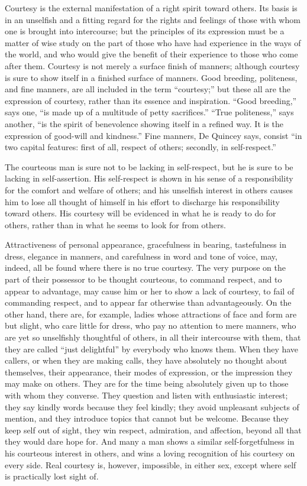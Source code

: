 \documentclass[
]{book}
\begin{document}
Courtesy is the external manifestation of a right spirit toward others. Its basis is in an unselfish and a fitting regard for the rights and feelings of those with whom one is brought into intercourse; but the principles of its expression must be a matter of wise study on the part of those who have had experience in the ways of the world, and who would give the benefit of their experience to those who come after them. Courtesy is not merely a surface finish of manners; although courtesy is sure to show itself in a finished surface of manners. Good breeding, politeness, and fine manners, are all included in the term ``courtesy;'' but these all are the expression of courtesy, rather than its essence and inspiration. ``Good breeding,'' says one, ``is made up of a multitude of petty sacrifices.'' ``True politeness,'' says another, ``is the spirit of benevolence showing itself in a refined way. It is the expression of good-will and kindness.'' Fine manners, De Quincey says, consist ``in two capital features: first of all, respect of others; secondly, in self-respect.''

The courteous man is sure not to be lacking in self-respect, but he is sure to be lacking in self-assertion. His self-respect is shown in his sense of a responsibility for the comfort and welfare of others; and his unselfish interest in others causes him to lose all thought of himself in his effort to discharge his responsibility toward others. His courtesy will be evidenced in what he is ready to do for others, rather than in what he seems to look for from others.

Attractiveness of personal appearance, gracefulness in bearing, tastefulness in dress, elegance in manners, and carefulness in word and tone of voice, may, indeed, all be found where there is no true courtesy. The very purpose on the part of their possessor to be thought courteous, to command respect, and to appear to advantage, may cause him or her to show a lack of courtesy, to fail of commanding respect, and to appear far otherwise than advantageously. On the other hand, there are, for example, ladies whose attractions of face and form are but slight, who care little for dress, who pay no attention to mere manners, who are yet so unselfishly thoughtful of others, in all their intercourse with them, that they are called ``just delightful'' by everybody who knows them. When they have callers, or when they are making calls, they have absolutely no thought about themselves, their appearance, their modes of expression, or the impression they may make on others. They are for the time being absolutely given up to those with whom they converse. They question and listen with enthusiastic interest; they say kindly words because they feel kindly; they avoid unpleasant subjects of mention, and they introduce topics that cannot but be welcome. Because they keep self out of sight, they win respect, admiration, and affection, beyond all that they would dare hope for. And many a man shows a similar self-forgetfulness in his courteous interest in others, and wins a loving recognition of his courtesy on every side. Real courtesy is, however, impossible, in either sex, except where self is practically lost sight of.
\end{document}
